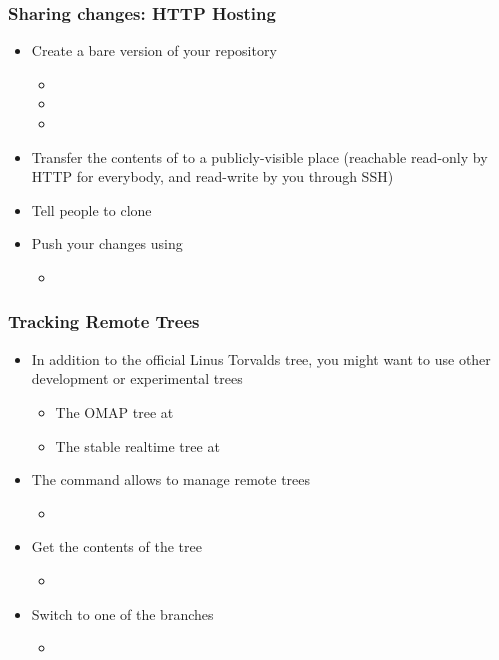 \begin{frame}
  \frametitle{Sharing changes: HTTP Hosting}
  \begin{itemize}
  \item Create a bare version of your repository
    \begin{itemize}
    \item {}
    \item {}
    \item {}
    \end{itemize}
  \item Transfer the contents of  to a
    publicly-visible place (reachable read-only by HTTP for everybody,
    and read-write by you through SSH)
  \item Tell people to clone
  \item Push your changes using
    \begin{itemize}
    \item
    \end{itemize}
  \end{itemize}
\end{frame}

\begin{frame}
  \frametitle{Tracking Remote Trees}
  \begin{itemize}
  \item In addition to the official Linus Torvalds tree, you might
    want to use other development or experimental trees
    \begin{itemize}
    \item The OMAP tree at
    \item The stable realtime tree at
    \end{itemize}
  \item The  command allows to manage remote trees
    \begin{itemize}
    \item
    \end{itemize}
  \item Get the contents of the tree
    \begin{itemize}
    \item {}
    \end{itemize}
  \item Switch to one of the branches
    \begin{itemize}
    \item {}
    \end{itemize}
  \end{itemize}
\end{frame}


